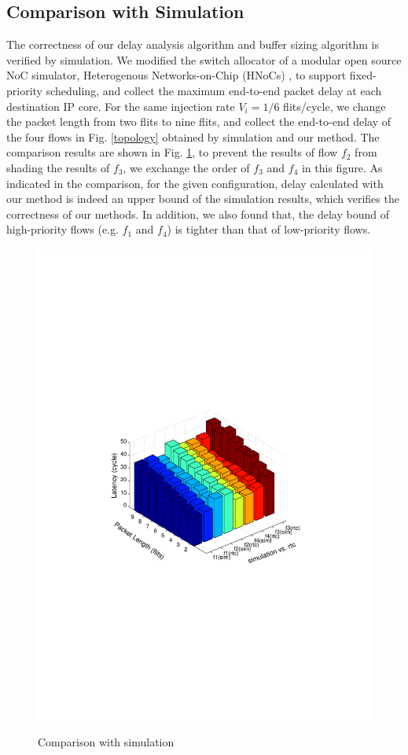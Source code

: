\documentclass[10pt,journal]{IEEEtran}
\begin{document}
\subsection{Comparison with Simulation}
The correctness of our delay analysis algorithm and buffer sizing algorithm is verified by simulation. We modified the switch allocator of a modular open source NoC simulator, Heterogenous Networks-on-Chip (HNoCs) \cite{6404157}, to support fixed-priority scheduling, and collect the maximum end-to-end packet delay at each destination IP core. For the same injection rate $V_i=1/6$ flits/cycle, we change the packet length from two flits to nine flits, and collect the end-to-end delay of the four flows in Fig. \ref{topology} obtained by simulation and our method. The comparison results are shown in Fig. \ref{rtcvssim}, to prevent the results of flow $f_2$ from shading the results of $f_3$, we exchange the order of $f_3$ and $f_4$ in this figure. As indicated in the comparison, for the given configuration, delay calculated with our method is indeed an upper bound of the simulation results, which verifies the correctness of our methods. In addition, we also found that, the delay bound of high-priority flows (e.g. $f_1$ and $f_4$) is tighter than that of low-priority flows.
\begin{figure}
  \centering
  \includegraphics[scale=0.65]{figures/rtcvssim.pdf}\\
  \caption{Comparison with simulation}\label{rtcvssim}
\end{figure}
\end{document}
